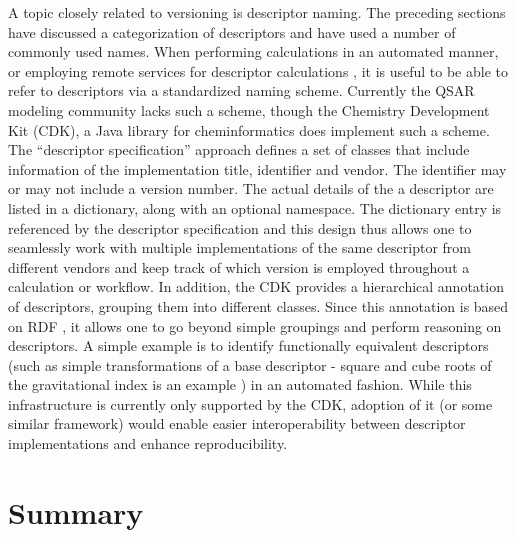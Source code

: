 \documentclass[letterpaper, 12pt]{article}
\begin{document}
A topic closely related to versioning is descriptor naming. The
preceding sections have discussed a categorization of descriptors and
have used a number of commonly used names. When performing
calculations in an automated manner, or employing remote services for
descriptor calculations \cite{Dong:2007aa}, it is useful to be able to
refer to descriptors via a standardized naming scheme. Currently the
QSAR modeling community lacks such a scheme, though the Chemistry
Development Kit (CDK), a Java library for cheminformatics
\cite{Steinbeck:2006aa} does implement such a scheme. The ``descriptor
specification'' approach defines a set of classes that include
information of the implementation title, identifier and vendor. The
identifier may or may not include a version number. The actual details
of the a descriptor are listed in a dictionary, along with an optional
namespace. The dictionary entry is referenced by the descriptor
specification and this design thus allows one to seamlessly work with
multiple implementations of the same descriptor from different vendors
and keep track of which version is employed throughout a calculation
or workflow. In addition, the CDK provides a hierarchical annotation
of descriptors, grouping them into different classes. Since this
annotation is based on RDF \cite{Taylor:2006ab}, it allows one to go
beyond simple groupings and perform reasoning on descriptors. A simple
example is to identify functionally equivalent descriptors (such as
simple transformations of a base descriptor - square and cube roots of
the gravitational index is an example \cite{Wessel:1998ve}) in an
automated fashion. While this infrastructure is currently only
supported by the CDK, adoption of it (or some similar framework) would
enable easier interoperability between descriptor implementations and
enhance reproducibility.

\section{Summary}
\label{sec:summary}
\end{document}
